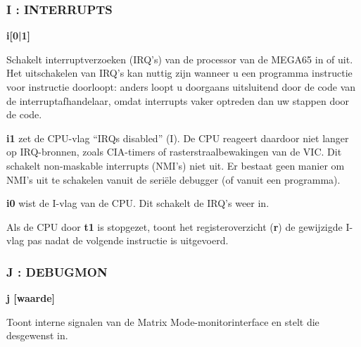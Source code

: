 \subsubsection{I : INTERRUPTS}
\begin{description}[leftmargin=2cm,style=nextline]
\item [Formaat:] {\bf i[0|1]}\item [Gebruik:] Schakelt interruptverzoeken (IRQ's) van de processor van de MEGA65 in of uit. Het uitschakelen van IRQ's kan nuttig zijn wanneer u een programma instructie voor instructie doorloopt: anders loopt u doorgaans uitsluitend door de code van de interruptafhandelaar, omdat interrupts vaker optreden dan uw stappen door de code.

  {\bf i1} zet de CPU-vlag ``IRQs disabled'' (I). De CPU reageert daardoor niet langer op IRQ-bronnen, zoals CIA-timers of rasterstraalbewakingen van de VIC. Dit schakelt non-maskable interrupts (NMI's) niet uit. Er bestaat geen manier om NMI's uit te schakelen vanuit de seriële debugger (of vanuit een programma).

  {\bf i0} wist de I-vlag van de CPU. Dit schakelt de IRQ's weer in.

\item [Opmerkingen:] Als de CPU door {\bf t1} is stopgezet, toont het registeroverzicht ({\bf r}) de gewijzigde I-vlag pas nadat de volgende instructie is uitgevoerd.

\end{description}

\subsubsection{J : DEBUGMON}
\begin{description}[leftmargin=2cm,style=nextline]
\item [Formaat:] {\bf j [waarde]}\item [Gebruik:] Toont interne signalen van de Matrix Mode-monitorinterface en stelt die desgewenst in.

\end{description}



